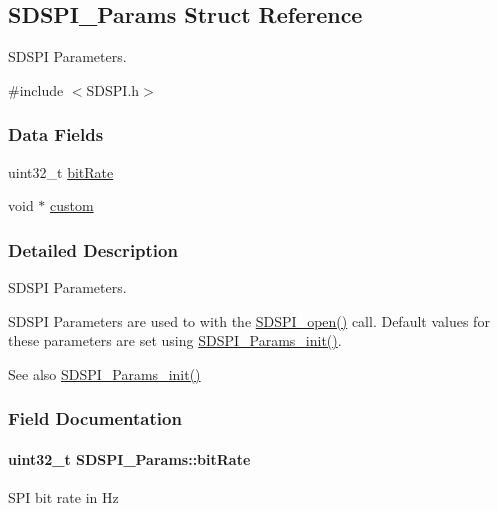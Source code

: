 \subsection{S\+D\+S\+P\+I\+\_\+\+Params Struct Reference}
\label{struct_s_d_s_p_i___params}


S\+D\+S\+P\+I Parameters.  




{\ttfamily \#include $<$S\+D\+S\+P\+I.\+h$>$}

\subsubsection*{Data Fields}
\begin{DoxyCompactItemize}
\item 
uint32\+\_\+t \hyperlink{struct_s_d_s_p_i___params_ad1885e9d1f89f0d756198454a9cefccb}{bit\+Rate}
\item 
void $\ast$ \hyperlink{struct_s_d_s_p_i___params_ae5376d1a99dd29d9213c94b46df69ea8}{custom}
\end{DoxyCompactItemize}


\subsubsection{Detailed Description}
S\+D\+S\+P\+I Parameters. 

S\+D\+S\+P\+I Parameters are used to with the \hyperlink{_s_d_s_p_i_8h_af4a5ca9bb35e8a7df02acf20ceeae66d}{S\+D\+S\+P\+I\+\_\+open()} call. Default values for these parameters are set using \hyperlink{_s_d_s_p_i_8h_a6fe24eaba1cca88242c5df360a074ca8}{S\+D\+S\+P\+I\+\_\+\+Params\+\_\+init()}.

\begin{DoxySeeAlso}{See also}
\hyperlink{_s_d_s_p_i_8h_a6fe24eaba1cca88242c5df360a074ca8}{S\+D\+S\+P\+I\+\_\+\+Params\+\_\+init()} 
\end{DoxySeeAlso}


\subsubsection{Field Documentation}
\paragraph[{bit\+Rate}]{\setlength{\rightskip}{0pt plus 5cm}uint32\+\_\+t S\+D\+S\+P\+I\+\_\+\+Params\+::bit\+Rate}\label{struct_s_d_s_p_i___params_ad1885e9d1f89f0d756198454a9cefccb}
S\+P\+I bit rate in Hz 
